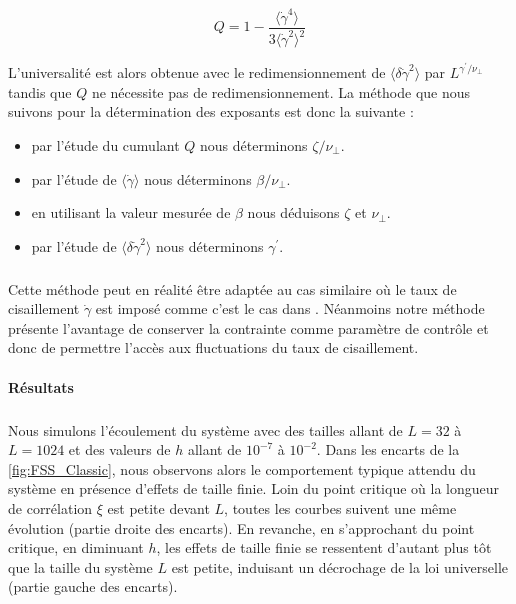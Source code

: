 \begin{equation}
    Q = 1 - \frac{\langle\dot{\gamma}^4\rangle}{3\langle\dot{\gamma}^2\rangle^2}
\end{equation}

\noindent L'universalité est alors obtenue avec le redimensionnement de $\langle\delta\dot{\gamma}^2\rangle$ par $L^{\gamma^\prime/\nu_\perp}$ tandis que $Q$ ne nécessite pas de redimensionnement. La méthode que nous suivons pour la détermination des exposants est donc la suivante : 

\begin{itemize}
	\item par l'étude du cumulant $Q$ nous déterminons $\zeta/\nu_\perp$.
	\item par l'étude de $\langle\dot{\gamma}\rangle$ nous déterminons $\beta/\nu_\perp$.
	\item en utilisant la valeur mesurée de $\beta$ nous déduisons $\zeta$ et $\nu_\perp$.
	\item par l'étude de $\langle\delta\dot{\gamma}^2\rangle$ nous déterminons $\gamma^\prime$.
\end{itemize}

\subparagraph{}Cette méthode peut en réalité être adaptée au cas similaire où le taux de cisaillement $\dot{\gamma}$ est imposé comme c'est le cas dans \cite{lin_scaling_2014}. Néanmoins notre méthode présente l'avantage de conserver la contrainte comme paramètre de contrôle et donc de permettre l'accès aux fluctuations du taux de cisaillement.

\paragraph{Résultats}

\subparagraph{}Nous simulons l'écoulement du système avec des tailles allant de $L=32$ à $L=1024$ et des valeurs de $h$ allant de $10^{-7}$ à $10^{-2}$. Dans les encarts de la \autoref{fig:FSS_Classic}, nous observons alors le comportement typique attendu du système en présence d'effets de taille finie. Loin du point critique où la longueur de corrélation $\xi$ est petite devant $L$, toutes les courbes suivent une même évolution (partie droite des encarts). En revanche, en s'approchant du point critique, en diminuant $h$, les effets de taille finie se ressentent d'autant plus tôt que la taille du système $L$ est petite, induisant un décrochage de la loi universelle (partie gauche des encarts).



